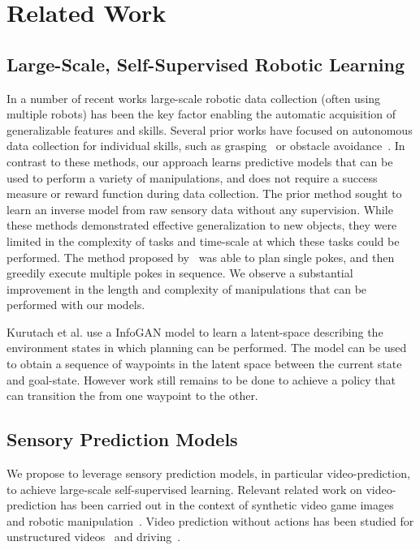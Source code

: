 \section{Related Work}\label{sec:rel_work}

\subsection{Large-Scale, Self-Supervised Robotic Learning}

In a number of recent works large-scale robotic data collection (often using multiple robots) has been the key factor enabling the automatic acquisition of generalizable features and skills. Several prior works have focused on autonomous data collection for individual skills, such as grasping~\cite{lerrel,google_handeye} or obstacle avoidance~\cite{greg_kahn_uncertainty,crashing}. In contrast to these methods, our approach learns predictive models that can be used to perform a variety of manipulations, and does not require a success measure or reward function during data collection. The prior method \cite{pulkit} sought to learn an inverse model from raw sensory data without any supervision.
While these methods demonstrated effective generalization to new objects, they were limited in the complexity of tasks and time-scale at which these tasks could be performed. The method proposed by~\cite{pulkit} was able to plan single pokes, and then greedily execute multiple pokes in sequence. We observe a substantial improvement in the length and complexity of manipulations that can be performed with our models.

Kurutach et al. use a InfoGAN model \cite{kurutach2018learning} to learn a latent-space describing the environment states in which planning can be performed. The model can be used to obtain a sequence of waypoints in the latent space between the current state and goal-state. However work still remains to be done to achieve a policy that can transition the from one waypoint to the other.

\subsection{Sensory Prediction Models}
We propose to leverage sensory prediction models, in particular video-prediction, to achieve large-scale self-supervised learning. Relevant related work on video-prediction has been carried out in the context of synthetic video game images~\cite{atarioh,recurrentsimulators} and robotic manipulation~\cite{bootsetal,finn_nips,video_pixel_networks}. Video prediction without actions has been studied for unstructured videos~\cite{beyond_mse,convlstm,vondrick} and driving~\cite{prednet,dynamic_filter_networks}. 

